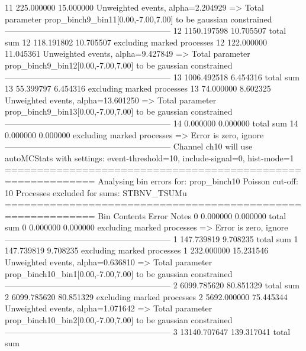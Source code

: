 11         225.000000      15.000000       Unweighted events, alpha=2.204929
  => Total parameter prop_binch9_bin11[0.00,-7.00,7.00] to be gaussian constrained
------------------------------------------------------------
12         1150.197598     10.705507       total sum                     
12         118.191802      10.705507       excluding marked processes    
12         122.000000      11.045361       Unweighted events, alpha=9.427849
  => Total parameter prop_binch9_bin12[0.00,-7.00,7.00] to be gaussian constrained
------------------------------------------------------------
13         1006.492518     6.454316        total sum                     
13         55.399797       6.454316        excluding marked processes    
13         74.000000       8.602325        Unweighted events, alpha=13.601250
  => Total parameter prop_binch9_bin13[0.00,-7.00,7.00] to be gaussian constrained
------------------------------------------------------------
14         0.000000        0.000000        total sum                     
14         0.000000        0.000000        excluding marked processes    
  => Error is zero, ignore      
------------------------------------------------------------
Channel ch10 will use autoMCStats with settings: event-threshold=10, include-signal=0, hist-mode=1
============================================================
Analysing bin errors for: prop_binch10
Poisson cut-off: 10
Processes excluded for sums: STBNV_TSUMu
============================================================
Bin        Contents        Error           Notes                         
0          0.000000        0.000000        total sum                     
0          0.000000        0.000000        excluding marked processes    
  => Error is zero, ignore      
------------------------------------------------------------
1          147.739819      9.708235        total sum                     
1          147.739819      9.708235        excluding marked processes    
1          232.000000      15.231546       Unweighted events, alpha=0.636810
  => Total parameter prop_binch10_bin1[0.00,-7.00,7.00] to be gaussian constrained
------------------------------------------------------------
2          6099.785620     80.851329       total sum                     
2          6099.785620     80.851329       excluding marked processes    
2          5692.000000     75.445344       Unweighted events, alpha=1.071642
  => Total parameter prop_binch10_bin2[0.00,-7.00,7.00] to be gaussian constrained
------------------------------------------------------------
3          13140.707647    139.317041      total sum                     
